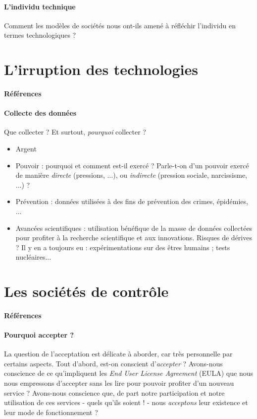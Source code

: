 \paragraph{L'individu technique} Comment les modèles de sociétés nous ont-ils amené à
réfléchir l'individu en termes technologiques ?


\section{L'irruption des technologies}
\paragraph{Références} \cite{Damasio:0} \cite{Marx:1} \cite{TechnoSocio:0} \cite{GhostInTheShell}

\paragraph{Collecte des données} Que collecter ? Et surtout, \emph{pourquoi} collecter ?
\begin{itemize}
    \item Argent
    \item Pouvoir : pourquoi et comment est-il exercé ? Parle-t-on d'un pouvoir exercé de
    manière \emph{directe} (pressions, ...), ou \emph{indirecte} (pression sociale,
    narcissisme, ...) ?
    \item Prévention : données utilisées à des fins de prévention des crimes, épidémies, ...
    \item Avancées scientifiques : utilisation bénéfique de la masse de données collectées
    pour profiter à la recherche scientifique et aux innovations. Risques de dérives ? Il y
    en a toujours eu : expérimentations sur des êtres humains ; tests nucléaires... 
\end{itemize}


\section{Les sociétés de contrôle}
\paragraph{Références} \cite{Huxley:0} \cite{Orwell:0} \cite{TechnoSocio:1}

\paragraph{Pourquoi accepter ?} La question de l'acceptation est délicate à aborder, car
très personnelle par certains aspects. Tout d'abord, est-on conscient d'\emph{accepter} ?
Avons-nous conscience de ce qu'impliquent les \emph{End User License Agreement} (EULA) que
nous nous empressons d'accepter sans les lire pour pouvoir profiter d'un nouveau service ?
Avons-nous conscience que, de part notre participation et notre utilisation de ces services
- quels qu'ils soient ! - nous \emph{acceptons} leur existence et leur mode de fonctionnement ?

